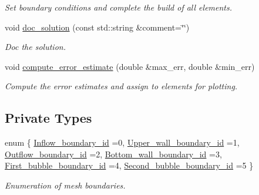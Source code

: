 \begin{DoxyCompactItemize}
\begin{DoxyCompactList}\small\item\em Set boundary conditions and complete the build of all elements. \end{DoxyCompactList}\item 
void \hyperlink{classBubbleInChannelProblem_a6a68ee06024107d7b3f92059365a06d1}{doc\+\_\+solution} (const std\+::string \&comment=\char`\"{}\char`\"{})
\begin{DoxyCompactList}\small\item\em Doc the solution. \end{DoxyCompactList}\item 
void \hyperlink{classBubbleInChannelProblem_ad400025c03926745e230e5f654c28562}{compute\+\_\+error\+\_\+estimate} (double \&max\+\_\+err, double \&min\+\_\+err)
\begin{DoxyCompactList}\small\item\em Compute the error estimates and assign to elements for plotting. \end{DoxyCompactList}\end{DoxyCompactItemize}
\subsection*{Private Types}
\begin{DoxyCompactItemize}
\item 
enum \{ \newline
\hyperlink{classBubbleInChannelProblem_a5cc2eecaafc178aa80ab1e66bb909fa9a74e672f81a49928bd0d69321acb3f7ea}{Inflow\+\_\+boundary\+\_\+id} =0, 
\hyperlink{classBubbleInChannelProblem_a5cc2eecaafc178aa80ab1e66bb909fa9a52a5fe0a55c757103b9eded639a789fe}{Upper\+\_\+wall\+\_\+boundary\+\_\+id} =1, 
\hyperlink{classBubbleInChannelProblem_a5cc2eecaafc178aa80ab1e66bb909fa9ad7c054a244fe70afadfbae778986e792}{Outflow\+\_\+boundary\+\_\+id} =2, 
\hyperlink{classBubbleInChannelProblem_a5cc2eecaafc178aa80ab1e66bb909fa9a0ad16aa9f84c4a6dadad5eb21c90e3b0}{Bottom\+\_\+wall\+\_\+boundary\+\_\+id} =3, 
\newline
\hyperlink{classBubbleInChannelProblem_a5cc2eecaafc178aa80ab1e66bb909fa9a203cab16fd7ad35c19896ea4eebebf68}{First\+\_\+bubble\+\_\+boundary\+\_\+id} =4, 
\hyperlink{classBubbleInChannelProblem_a5cc2eecaafc178aa80ab1e66bb909fa9a14ffa03e38c0c2bdbfcfe6f190cfae12}{Second\+\_\+bubble\+\_\+boundary\+\_\+id} =5
 \}\begin{DoxyCompactList}\small\item\em Enumeration of mesh boundaries. \end{DoxyCompactList}
\end{DoxyCompactItemize}

